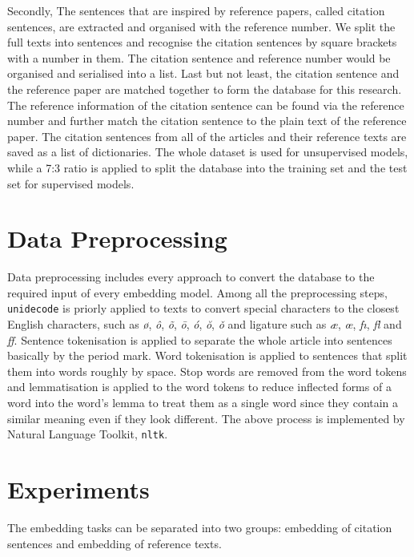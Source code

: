 Secondly, The sentences that are inspired by reference papers, called citation sentences, are extracted and organised with the reference number.
We split the full texts into sentences and recognise the citation sentences by square brackets with a number in them.
The citation sentence and reference number would be organised and serialised into a list.
Last but not least, the citation sentence and the reference paper are matched together to form the database for this research.
The reference information of the citation sentence can be found via the reference number and further match the citation sentence to the plain text of the reference paper.
The citation sentences from all of the articles and their reference texts are saved as a list of dictionaries.
The whole dataset is used for unsupervised models, while a 7:3 ratio is applied to split the database into the training set and the test set for supervised models.

\section{Data Preprocessing}
Data preprocessing includes every approach to convert the database to the required input of every embedding model.
Among all the preprocessing steps, \texttt{unidecode} is priorly applied to texts to convert special characters to the closest English characters, such as \textit{\o}, \textit{\^o}, \textit{\~o}, \textit{\=o}, \textit{\'o}, \textit{\u o}, \textit{\v o} and ligature such as \textit{\ae}, \textit{\oe}, \textit{f\i}, \textit{fl} and \textit{ff}.
Sentence tokenisation is applied to separate the whole article into sentences basically by the period mark.
Word tokenisation is applied to sentences that split them into words roughly by space.
Stop words are removed from the word tokens and lemmatisation is applied to the word tokens to reduce inflected forms of a word into the word's lemma to treat them as a single word since they contain a similar meaning even if they look different.
The above process is implemented by Natural Language Toolkit, \texttt{nltk}.

\section{Experiments}
The embedding tasks can be separated into two groups: embedding of citation sentences and embedding of reference texts.

